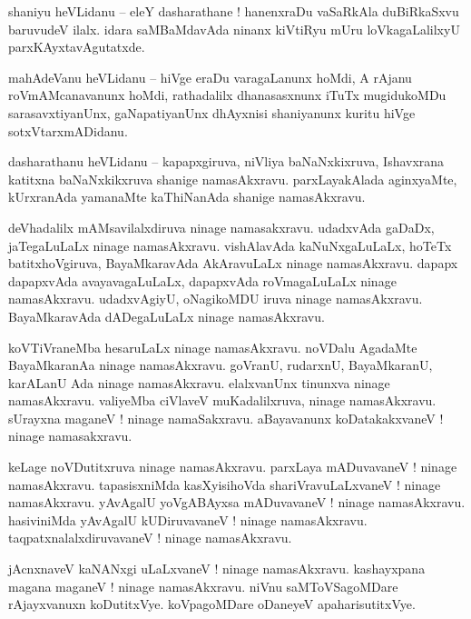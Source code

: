 \documentclass{article}
\begin{document}
\begin{mn}%
shaniyu heVLidanu -- eleY dasharathane ! hanenxraDu vaSaRkAla duBiRkaSxvu baruvudeV ilalx. idara 
saMBaMdavAda ninanx kiVtiRyu mUru loVkagaLalilxyU parxKAyxtavAgutatxde.
\end{mn}

\begin{mn}%
mahAdeVanu heVLidanu -- hiVge eraDu varagaLanunx hoMdi, A rAjanu roVmAMcanavanunx hoMdi, 
rathadalilx dhanasasxnunx iTuTx mugidukoMDu sarasavxtiyanUnx, gaNapatiyanUnx dhAyxnisi shaniyanunx 
kuritu hiVge sotxVtarxmADidanu.
\end{mn}

\begin{mn}%
dasharathanu heVLidanu -- kapapxgiruva, niVliya baNaNxkixruva, Ishavxrana katitxna baNaNxkikxruva 
shanige namasAkxravu. parxLayakAlada aginxyaMte, kUrxranAda yamanaMte kaThiNanAda shanige 
namasAkxravu.
\end{mn}

\begin{mn}%
deVhadalilx mAMsavilalxdiruva ninage namasakxravu. udadxvAda gaDaDx, jaTegaLuLaLx ninage 
namasAkxravu. vishAlavAda kaNuNxgaLuLaLx, hoTeTx batitxhoVgiruva, BayaMkaravAda AkAravuLaLx ninage 
namasAkxravu. dapapx dapapxvAda avayavagaLuLaLx, dapapxvAda roVmagaLuLaLx ninage namasAkxravu. 
udadxvAgiyU, oNagikoMDU iruva ninage namasAkxravu. BayaMkaravAda dADegaLuLaLx ninage namasAkxravu.
\end{mn}

\begin{mn}%
koVTiVraneMba hesaruLaLx ninage namasAkxravu. noVDalu AgadaMte BayaMkaranAa ninage namasAkxravu. 
goVranU, rudarxnU, BayaMkaranU, karALanU Ada ninage namasAkxravu. elalxvanUnx tinunxva ninage 
namasAkxravu. valiyeMba ciVlaveV muKadalilxruva, ninage namasAkxravu. sUrayxna maganeV ! ninage 
namaSakxravu. aBayavanunx koDatakakxvaneV ! ninage namasakxravu.
\end{mn}

\begin{mn}%
keLage noVDutitxruva ninage namasAkxravu. parxLaya mADuvavaneV ! ninage namasAkxravu. tapasisxniMda 
kasXyisihoVda shariVravuLaLxvaneV ! ninage namasAkxravu. yAvAgalU yoVgABAyxsa mADuvavaneV ! ninage 
namasAkxravu. hasiviniMda yAvAgalU kUDiruvavaneV ! ninage namasAkxravu. taqpatxnalalxdiruvavaneV ! 
ninage namasAkxravu.
\end{mn}

\begin{mn}%
jAcnxnaveV kaNANxgi uLaLxvaneV ! ninage namasAkxravu. kashayxpana magana maganeV ! ninage 
namasAkxravu. niVnu saMToVSagoMDare rAjayxvanuxn koDutitxVye. koVpagoMDare oDaneyeV 
apaharisutitxVye.
\end{mn}
\end{document}
